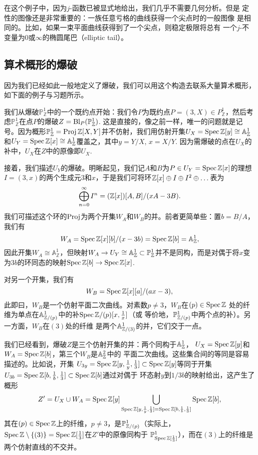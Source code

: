 在这个例子中，因为$j$-函数已被显式地给出，我们几乎不需要几何分析。但是
定性的图像还是非常重要的：一族任意亏格的曲线获得一个尖点时的一般图像
是相同的。比如，如果一束平面曲线获得到了一个尖点，则稳定极限将总有
一个$j$-不变量为$0$或$\infty$的椭圆尾巴（elliptic tail）。

\subsection{算术概形的爆破}\label{s:4.2.4}

因为我们已经如此一般地定义了爆破，我们可以用这个构造去联系大量算术概形，如下面的例子与习题所示。

我们从爆破$\mathbb P_{\mathbb Z}^1$中的一个既约点开始：我们令$P$为既约点$P=(3,X)\in P_{\mathbb Z}^1$，然后考虑$\mathbb P_{\mathbb Z}^1$在点$P$的爆破$Z=\operatorname{Bl}_P(\mathbb P_{\mathbb Z}^1)$. 这是直接的，像之前一样，唯一的问题就是记号。因为概形$\mathbb P_{\mathbb Z}^1=\operatorname{Proj} \mathbb{Z}[X,Y]$并不仿射，我们用仿射开集$U_X=\operatorname{Spec} \mathbb{Z}[y]\cong \mathbb A_{\mathbb Z}^1$和$U_Y=\operatorname{Spec} \mathbb{Z}[x]\cong \mathbb A_{\mathbb Z}^1$覆盖之，其中$y=Y/X$, $x=X/Y$. 因为需爆破的点在$U_X$的补中，$U_X$在$Z$中的原像即$U_X$.

接着，我们描述$U_Y$的爆破。明晰起见，我们记$A$和$B$为$P\in U_Y=\operatorname{Spec} \mathbb{Z}[x]$的理想$I=(3,x)$的两个生成元$3$和$x$，于是我们可将环$\mathbb{Z}[x]\oplus I\oplus I^2\oplus \dots$表为
\[
	\bigoplus_{n=0}^\infty I^n=(\mathbb{Z}[x])[A,B]/(xA-3B).
\]%
我们可描述这个环的$\operatorname{Proj}$为两个开集$W_A$和$W_B$的并。前者更简单些：置$b=B/A$，我们有
\[
	W_A=\operatorname{Spec} \mathbb{Z}[x][b]/(x-3b)=\operatorname{Spec} \mathbb{Z}[b]=\mathbb A_{\mathbb{Z}}^1,
\]
因此开集$W_A\cong \mathbb A_{\mathbb Z}^1$，但映射$W_A\to U_Y\cong \mathbb A_{\mathbb{Z}}^1\subset \mathbb P_{\mathbb{Z}}^1$并不是同构，而是对偶于将$x$变为$3b$的环同态的映射$\operatorname{Spec} \mathbb{Z}[b]\to \operatorname{Spec} \mathbb{Z}[x]$.

对另一个开集，我们有
\[
	W_B=\operatorname{Spec} \mathbb{Z}[x][a]/(ax-3),
\]
此即曰，$W_B$是一个仿射平面二次曲线。对素数$p\neq 3$，$W_B$在$(p)\in \operatorname{Spec} \mathbb{Z}$
处的纤维为单点在$\mathbb{A}_{\mathbb{Z}/(p)}^1$中的补$\operatorname{Spec} \mathbb{Z}/(p)[x,\frac 1x]$（或
等价地，$\mathbb{P}_{\mathbb{Z}/(p)}^1$中两个点的补）。另一方面，$W_B$在$(3)$处的纤维
是两个$\mathbb{A}_{\mathbb{Z}/(3)}^1$的并，它们交于一点。

我们已经看到，爆破$Z$是三个仿射开集的并：两个同构于$\mathbb A_{\mathbb{Z}}^1$，
$U_X=\operatorname{Spec} \mathbb{Z}[y]$和$W_A=\operatorname{Spec} \mathbb{Z}[b]$，第三个$W_B$是$\mathbb{A}_{\mathbb{Z}}^2$中的
平面二次曲线。这些集合间的等同是容易描述的。比如说，开集
$U_{3y}=\operatorname{Spec} \mathbb{Z}[y,\frac 1y,\frac 13]\subset \operatorname{Spec} \mathbb{Z}[y]$等同于开集
$U_{3b}=\operatorname{Spec} \mathbb{Z}[b,\frac 1b,\frac 13]\subset \operatorname{Spec} \mathbb{Z}[b]$通过对偶于
环态射$y$到$1/3b$的映射给出，这产生了概形
\[
	Z'=U_X\cup W_A=\operatorname{Spec} \mathbb{Z}[y]\bigcup_{\operatorname{Spec} \mathbb{Z}[y,\frac 1y,\frac 13]=\operatorname{Spec} \mathbb{Z}[b,\frac 1b,\frac 13]}\operatorname{Spec} \mathbb{Z}[b],
\]
其在$(p)\in \operatorname{Spec} \mathbb{Z}$上的纤维，$p\neq 3$，是$\mathbb{P}_{\mathbb{Z}/(p)}^1$（实际上，
$\operatorname{Spec} \mathbb{Z}\setminus\{(3)\}=\operatorname{Spec} \mathbb{Z}[\frac 13]$在$Z'$中的原像同构于
$\mathbb{P}^1_{\operatorname{Spec} \mathbb{Z}[\frac 13]}$），而在$(3)$上的纤维是两个仿射直线的不交并。

